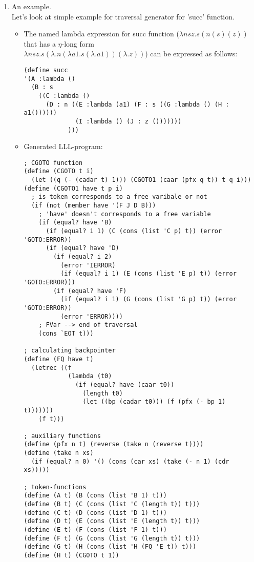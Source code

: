 \documentclass[a4paper, 10pt]{article}
\begin{document}
\begin{enumerate}
\item An example.\\
  Let's look at simple example for traversal generator for 'succ' function.
  \begin{itemize}
  \item The named lambda expression for succ function ($\lambda n s z . s (n (s) (z))$ that has a $\eta$-long form \\ $\lambda n s z . s (\lambda . n (\lambda a1 . s (\lambda . a1)) (\lambda . z))$) can be expressed as follows:
    \begin{verbatim}
(define succ
'(A :lambda ()
  (B : s
    ((C :lambda ()
      (D : n ((E :lambda (a1) (F : s ((G :lambda () (H : a1())))))
              (I :lambda () (J : z ()))))))
            )))
    \end{verbatim}
  \item Generated LLL-program:
    \begin{verbatim}
; CGOTO function
(define (CGOTO t i)
  (let ((q (- (cadar t) 1))) (CGOTO1 (caar (pfx q t)) t q i)))
(define (CGOTO1 have t p i)
  ; is token corresponds to a free varibale or not
  (if (not (member have '(F J D B)))
    ; 'have' doesn't corresponds to a free variable
    (if (equal? have 'B)
      (if (equal? i 1) (C (cons (list 'C p) t)) (error 'GOTO:ERROR))
      (if (equal? have 'D)
        (if (equal? i 2)
          (error 'IERROR)
          (if (equal? i 1) (E (cons (list 'E p) t)) (error 'GOTO:ERROR)))
        (if (equal? have 'F)
          (if (equal? i 1) (G (cons (list 'G p) t)) (error 'GOTO:ERROR))
          (error 'ERROR))))
    ; FVar --> end of traversal
    (cons `EOT t)))

; calculating backpointer
(define (FQ have t)
  (letrec ((f
            (lambda (t0)
              (if (equal? have (caar t0))
                (length t0)
                (let ((bp (cadar t0))) (f (pfx (- bp 1) t)))))))
    (f t)))

; auxiliary functions
(define (pfx n t) (reverse (take n (reverse t))))
(define (take n xs)
  (if (equal? n 0) '() (cons (car xs) (take (- n 1) (cdr xs)))))

; token-functions
(define (A t) (B (cons (list 'B 1) t)))
(define (B t) (C (cons (list 'C (length t)) t)))
(define (C t) (D (cons (list 'D 1) t)))
(define (D t) (E (cons (list 'E (length t)) t)))
(define (E t) (F (cons (list 'F 1) t)))
(define (F t) (G (cons (list 'G (length t)) t)))
(define (G t) (H (cons (list 'H (FQ 'E t)) t)))
(define (H t) (CGOTO t 1))


\end{verbatim}
\end{itemize}
\end{enumerate}
\end{document}
